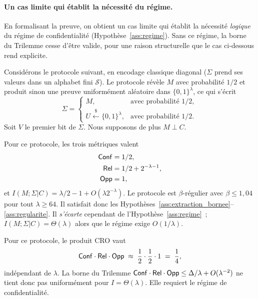\begin{sloppypar}
\paragraph{Un cas limite qui \'etablit la n\'ecessit\'e du r\'egime.}
En formalisant la preuve, on obtient un cas limite qui \'etablit la
n\'ecessit\'e \emph{logique} du r\'egime de confidentialit\'e
(Hypoth\`ese~\ref{ass:regime}). Sans ce r\'egime, la borne du Trilemme
cesse d'\^etre valide, pour une raison structurelle que le cas ci-dessous
rend explicite.

Consid\'erons le protocole suivant, en encodage classique diagonal
($\Sigma$ prend ses valeurs dans un alphabet fini $\mathcal{S}$). Le
protocole r\'ev\`ele $M$ avec probabilit\'e $1/2$ et produit sinon une
preuve uniform\'ement al\'eatoire dans $\{0,1\}^\lambda$, ce qui s'\'ecrit
\begin{equation}
\Sigma =
\begin{cases}
M, & \text{avec probabilit\'e } 1/2, \\
U \xleftarrow{\$} \{0,1\}^\lambda, & \text{avec probabilit\'e } 1/2.
\end{cases}
\label{eq:counterexample_protocol}
\end{equation}
Soit $V$ le premier bit de $\Sigma$. Nous supposons de plus $M \perp C$.

Pour ce protocole, les trois m\'etriques valent
\begin{align}
\mathsf{Conf} &= 1/2, \\
\mathsf{Rel} &= 1/2 + 2^{-\lambda-1}, \\
\mathsf{Opp} &= 1,
\end{align}
et $I(M;\Sigma|C) = \lambda/2 - 1 + O(\lambda 2^{-\lambda})$. Le
protocole est $\beta$-r\'egulier avec $\beta \leq 1{,}04$ pour tout
$\lambda \geq 64$. Il satisfait donc les
Hypoth\`eses~\ref{ass:extraction_bornee}--\ref{ass:regularite}. Il
\emph{s'\'ecarte} cependant de l'Hypoth\`ese~\ref{ass:regime}~;
$I(M;\Sigma|C) = \Theta(\lambda)$ alors que le r\'egime exige $O(1/\lambda)$.

Pour ce protocole, le produit CRO vaut
\begin{equation}
\mathsf{Conf} \cdot \mathsf{Rel} \cdot \mathsf{Opp} \;\approx\; \frac{1}{2} \cdot \frac{1}{2} \cdot 1 \;=\; \frac{1}{4},
\end{equation}
ind\'ependant de $\lambda$. La borne du Trilemme
$\mathsf{Conf} \cdot \mathsf{Rel} \cdot \mathsf{Opp} \leq \Delta/\lambda + O(\lambda^{-2})$ ne
tient donc pas uniform\'ement pour $I = \Theta(\lambda)$. Elle
requiert le r\'egime de confidentialit\'e.


\end{sloppypar}
